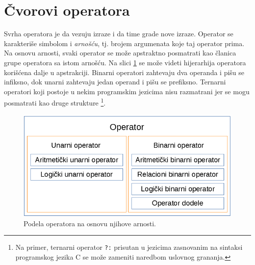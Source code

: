 \section{Čvorovi operatora}
\label{sec:MyASTOperatorNodes}

Svrha operatora je da vezuju izraze i da time grade nove izraze. Operator se karakteriše simbolom i \emph{arnošću}, tj. brojem argumenata koje taj operator prima. Na osnovu arnosti, svaki operator se može apstraktno posmatrati kao članica grupe operatora sa istom arnošću. Na slici \ref{fig:OperatorNodes} se može videti hijerarhija operatora korišćena dalje u apstrakciji. Binarni operatori zahtevaju dva operanda i pišu se infiksno, dok unarni zahtevaju jedan operand i pišu se prefiksno. Ternarni operatori koji postoje u nekim programskim jezicima nisu razmatrani jer se mogu posmatrati kao druge strukture \footnote{Na primer, ternarni operator \texttt{?:} prisutan u jezicima zasnovanim na sintaksi programskog jezika C se može zameniti naredbom uslovnog grananja.}. 

\begin{figure}[h!]
    \centering
        \includegraphics[scale=0.7]{images/operator_nodes.png}
    \caption{Podela operatora na osnovu njihove arnosti.}
    \label{fig:OperatorNodes}
\end{figure}

